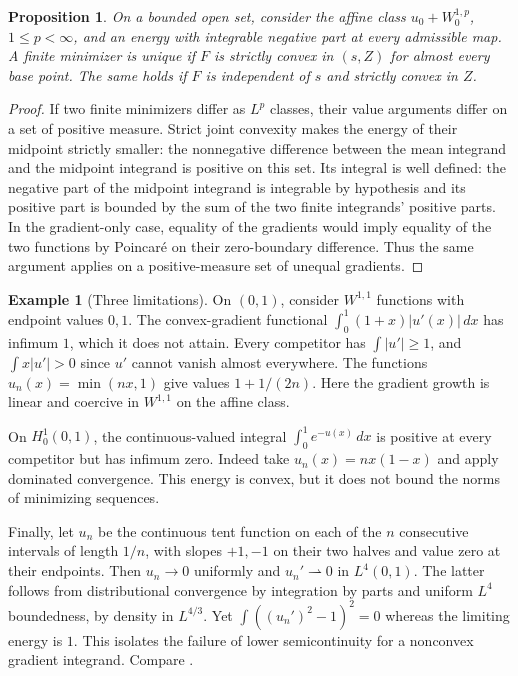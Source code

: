 \documentclass[11pt,oneside,openany]{book}
\theoremstyle{plain}
\newtheorem{proposition}[theorem]{Proposition}
\theoremstyle{definition}
\newtheorem{example}[theorem]{Example}
\theoremstyle{remark}
\begin{document}
\begin{proposition}\label{prop:sobolev-unique}
On a bounded open set, consider the affine class
\(u_0+W^{1,p}_0\), \(1\le p<\infty\), and an energy with
integrable negative part at every admissible map. A finite
minimizer is unique if \(F\) is strictly convex in \((s,Z)\)
for almost every base point. The same holds if \(F\) is
independent of \(s\) and strictly convex in \(Z\).
\end{proposition}

\begin{proof}
If two finite minimizers differ as \(L^p\) classes, their value
arguments differ on a set of positive measure. Strict joint
convexity makes the energy of their midpoint strictly smaller:
the nonnegative difference between the mean integrand and the
midpoint integrand is positive on this set. Its integral is
well defined: the negative part of the midpoint integrand is
integrable by hypothesis and its positive part is bounded by
the sum of the two finite integrands' positive parts.
In the gradient-only case, equality of the
gradients would imply equality of the two functions by
Poincar\'e on their zero-boundary difference. Thus the same
argument applies on a positive-measure set of unequal gradients.
\end{proof}

\begin{example}[Three limitations]\label{ex:direct-limitations}
On \((0,1)\), consider \(W^{1,1}\) functions with endpoint values
\(0,1\). The convex-gradient functional
\(\int_0^1(1+x)|u'(x)|\,dx\) has infimum \(1\), which it does not
attain. Every competitor has \(\int|u'|\ge1\), and
\(\int x|u'|>0\) since \(u'\) cannot vanish almost everywhere.
The functions \(u_n(x)=\min(nx,1)\) give values \(1+1/(2n)\).
Here the gradient growth is linear and coercive in \(W^{1,1}\)
on the affine class.

On \(H^1_0(0,1)\), the continuous-valued integral
\(\int_0^1 e^{-u(x)}\,dx\) is positive at every competitor but
has infimum zero. Indeed take \(u_n(x)=nx(1-x)\) and apply
dominated convergence. This energy is convex, but it does not
bound the norms of minimizing sequences.

Finally, let \(u_n\) be the continuous tent function on each
of the \(n\) consecutive intervals of length \(1/n\), with
slopes \(+1,-1\) on their two halves and value zero at their
endpoints. Then \(u_n\to0\) uniformly and \(u_n'\rightharpoonup0\)
in \(L^4(0,1)\). The latter follows from distributional
convergence by integration by parts and uniform \(L^4\)
boundedness, by density in \(L^{4/3}\).
Yet \(\int((u_n')^2-1)^2=0\) whereas the limiting energy is
\(1\). This isolates the failure of lower semicontinuity for a
nonconvex gradient integrand. Compare
\cite[Examples 3.7--3.10]{Dacorogna}.
\end{example}
\end{document}
